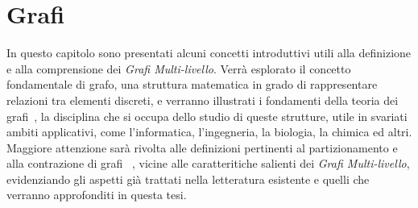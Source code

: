 \chapter{Grafi}\label{cap:grafi-e-approccio-multi-livello}

In questo capitolo sono presentati alcuni concetti introduttivi utili alla definizione e alla comprensione dei
\textit{Grafi Multi-livello}.
Verr\`a esplorato il concetto fondamentale di grafo, una struttura matematica in grado di rappresentare relazioni tra
elementi discreti, e verranno illustrati i fondamenti della teoria dei grafi~\cite{cormen2010introduction,gross2018graph},
la disciplina che si occupa dello studio di queste strutture, utile in svariati ambiti applicativi, come l'informatica,
l'ingegneria, la biologia, la chimica ed altri.
Maggiore attenzione sar\`a rivolta alle definizioni pertinenti al partizionamento e alla contrazione di
grafi ~\cite{Sanders2012HighQG}, vicine alle caratteritiche salienti dei \textit{Grafi Multi-livello},
evidenziando gli aspetti gi\`a trattati nella letteratura esistente e quelli che verranno approfonditi in questa tesi.









